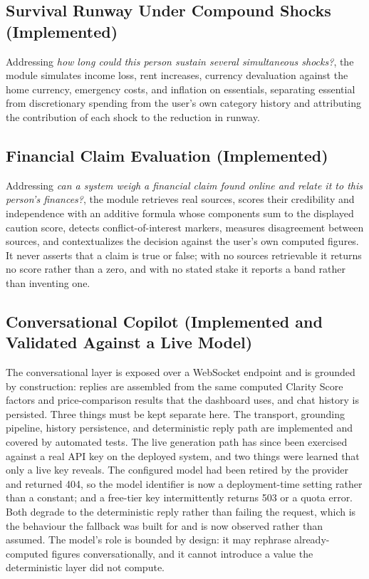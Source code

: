 \documentclass[conference]{IEEEtran}
\begin{document}
\subsection{Survival Runway Under Compound Shocks (Implemented)}

Addressing \emph{how long could this person sustain several simultaneous shocks?}, the module simulates income loss, rent increases, currency devaluation against the home currency, emergency costs, and inflation on essentials, separating essential from discretionary spending from the user's own category history and attributing the contribution of each shock to the reduction in runway.

\subsection{Financial Claim Evaluation (Implemented)}

Addressing \emph{can a system weigh a financial claim found online and relate it to this person's finances?}, the module retrieves real sources, scores their credibility and independence with an additive formula whose components sum to the displayed caution score, detects conflict-of-interest markers, measures disagreement between sources, and contextualizes the decision against the user's own computed figures. It never asserts that a claim is true or false; with no sources retrievable it returns no score rather than a zero, and with no stated stake it reports a band rather than inventing one.

\subsection{Conversational Copilot (Implemented and Validated Against a Live Model)}

The conversational layer is exposed over a WebSocket endpoint and is grounded by construction: replies are assembled from the same computed Clarity Score factors and price-comparison results that the dashboard uses, and chat history is persisted. Three things must be kept separate here. The transport, grounding pipeline, history persistence, and deterministic reply path are implemented and covered by automated tests. The live generation path has since been exercised against a real API key on the deployed system, and two things were learned that only a live key reveals. The configured model had been retired by the provider and returned 404, so the model identifier is now a deployment-time setting rather than a constant; and a free-tier key intermittently returns 503 or a quota error. Both degrade to the deterministic reply rather than failing the request, which is the behaviour the fallback was built for and is now observed rather than assumed. The model's role is bounded by design: it may rephrase already-computed figures conversationally, and it cannot introduce a value the deterministic layer did not compute.
\end{document}
